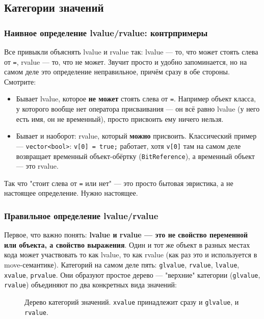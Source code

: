 \subsection{Категории значений}
\subsubsection{Наивное определение lvalue/rvalue: контрпримеры}
Все привыкли объяснять lvalue и rvalue так: lvalue --- то, что может стоять слева от \texttt{=}, rvalue --- то, что не может. Звучит просто и удобно запоминается, но на самом деле это определение неправильное, причём сразу в обе стороны. Смотрите:
\begin{itemize}
  \item Бывает lvalue, которое \textbf{не может} стоять слева от \texttt{=}. Например объект класса, у которого вообще нет оператора присваивания --- он всё равно lvalue (у него есть имя, он не временный), просто присвоить ему ничего нельзя.
  \item Бывает и наоборот: rvalue, который \textbf{можно} присвоить. Классический пример --- \texttt{vector<bool>}: \texttt{v[0] = true;} работает, хотя \texttt{v[0]} там на самом деле возвращает временный объект-обёртку (\texttt{BitReference}), а временный объект --- это rvalue.
\end{itemize}
Так что "стоит слева от \texttt{=} или нет" --- это просто бытовая эвристика, а не настоящее определение. Нужно настоящее.
\subsubsection{Правильное определение lvalue/rvalue}
Первое, что важно понять: \textbf{lvalue и rvalue --- это не свойство переменной или объекта, а свойство выражения}. Один и тот же объект в разных местах кода может участвовать то как lvalue, то как rvalue (как раз это и используется в move-семантике).
Категорий на самом деле пять: \texttt{glvalue}, \texttt{rvalue}, \texttt{lvalue}, \texttt{xvalue}, \texttt{prvalue}. Они образуют простое дерево --- "верхние" категории (\texttt{glvalue}, \texttt{rvalue}) объединяют по два конкретных вида значений:

\begin{figure}[htp]
\centering
{}
\caption{Дерево категорий значений. \texttt{xvalue} принадлежит сразу и \texttt{glvalue}, и \texttt{rvalue}.}
\end{figure}


